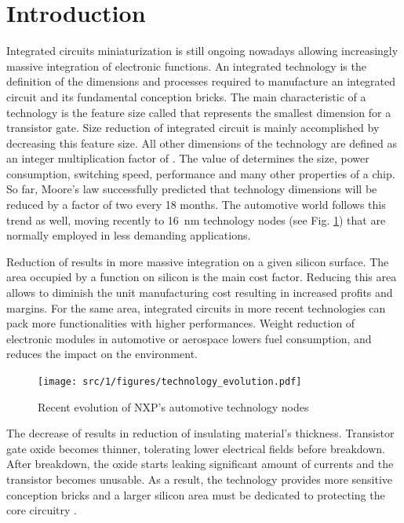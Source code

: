 \chapter*{Introduction}
 
\label{sec:global-intro}

Integrated circuits miniaturization is still ongoing nowadays allowing increasingly massive integration of electronic functions.
An integrated technology is the definition of the dimensions and processes required to manufacture an integrated circuit and its fundamental conception bricks.
The main characteristic of a technology is the feature size called \textlambda{} that represents the smallest dimension for a transistor gate.
Size reduction of integrated circuit is mainly accomplished by decreasing this feature size.
All other dimensions of the technology are defined as an integer multiplication factor of \textlambda{}.
The value of \textlambda{} determines the size, power consumption, switching speed, performance and many other properties of a chip.
So far, Moore's law successfully predicted that technology dimensions will be reduced by a factor of two every 18 months.
The automotive world follows this trend as well, moving recently to \SI{16}{\nano\metre} technology nodes (see Fig. \ref{fig:nxp-techno-increase}) \cite{evolution_technologies} that are normally employed in less demanding applications.

Reduction of \textlambda{} results in more massive integration on a given silicon surface.
The area occupied by a function on silicon is the main cost factor.
Reducing this area allows to diminish the unit manufacturing cost resulting in increased profits and margins.
For the same area, integrated circuits in more recent technologies can pack more functionalities with higher performances.
Weight reduction of electronic modules in automotive or aerospace lowers fuel consumption, and reduces the impact on the environment.

\begin{figure}[!h]
  \centering
  \texttt{[image: src/1/figures/technology\_evolution.pdf]}
  \caption{Recent evolution of NXP's automotive technology nodes \cite{evolution_technologies}}
  \label{fig:nxp-techno-increase}
\end{figure}

The decrease of \textlambda{} results in reduction of insulating material's thickness.
Transistor gate oxide becomes thinner, tolerating lower electrical fields before breakdown.
After breakdown, the oxide starts leaking significant amount of currents and the transistor becomes unusable.
As a result, the technology provides more sensitive conception bricks and a larger silicon area must be dedicated to protecting the core circuitry \cite{evolution_technologies}.

